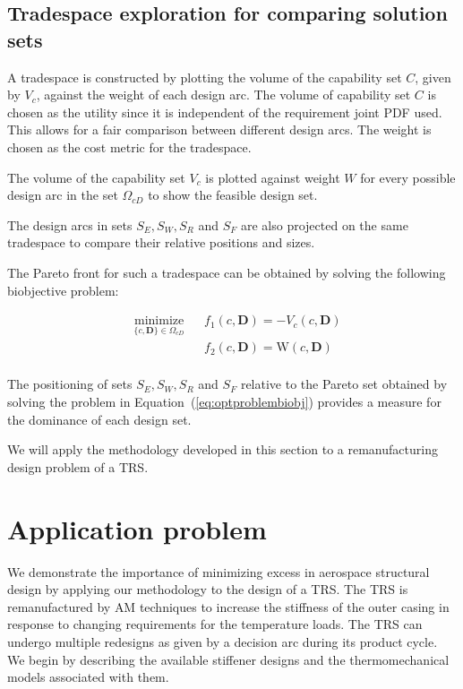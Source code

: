 \subsection{Tradespace exploration for comparing solution sets} \label{subsec:TSE}

A tradespace is constructed by plotting the volume of the capability set $C$, given by $V_c$, against the weight of each design arc. The volume of capability set $C$ is chosen as the utility since it is independent of the requirement joint \ac{PDF} used. This allows for a fair comparison between different design arcs. The weight is chosen as the cost metric for the tradespace.

The volume of the capability set $V_c$ is plotted against weight $W$ for every possible design arc in the set $\Omega_{cD}$ to show the feasible design set.

The design arcs in sets $S_E,S_W,S_R$ and $S_F$ are also projected on the same tradespace to compare their relative positions and sizes.

The Pareto front for such a tradespace can be obtained by solving the following biobjective problem:

\begin{equation}
	\label{eq:optproblembiobj}
	\begin{aligned}
		& \underset{\{c,\mathbf{D}\}\in\Omega_{cD}}{\text{minimize}}
		& & {f_1}(c,\mathbf{D}) = -V_c(c,\mathbf{D})\\
		& & & {f_2}(c,\mathbf{D}) = \textrm{W}\left(c,\mathbf{D}\right)\\
	\end{aligned}
\end{equation}

The positioning of sets $S_E,S_W,S_R$ and $S_F$ relative to the Pareto set obtained by solving the problem in Equation~(\ref{eq:optproblembiobj}) provides a measure for the dominance of each design set.

We will apply the methodology developed in this section to a remanufacturing design problem of a \ac{TRS}.

\section{Application problem} \label{sec:TSEcasestudy}

We demonstrate the importance of minimizing excess in aerospace structural design by applying our methodology to the design of a \acf{TRS}. The \ac{TRS} is remanufactured by \ac{AM} techniques to increase the stiffness of the outer casing in response to changing requirements for the temperature loads. The \ac{TRS} can undergo multiple redesigns as given by a decision arc during its product cycle. We begin by describing the available stiffener designs and the thermomechanical models associated with them.

